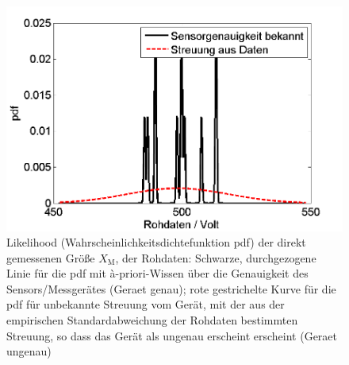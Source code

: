 \begin{figure}[!htp]
	\begin{center}
		\includegraphics[width=120mm]{10_vorlesung/media/Rohdaten.png}
		\caption{Likelihood (Wahrscheinlichkeitsdichtefunktion pdf)
		der direkt gemessenen Größe $X_\mathrm{M}$, der Rohdaten: Schwarze, durchgezogene Linie
		für die pdf mit {\`a}-priori-Wissen über die Genauigkeit des Sensors/Messgerätes
		(\glqq Geraet genau\grqq);
		rote gestrichelte Kurve für die pdf für unbekannte Streuung vom Gerät,
		mit der aus der empirischen Standardabweichung der Rohdaten
		bestimmten Streuung, so dass das Gerät als ungenau erscheint erscheint (\glqq Geraet ungenau\grqq)}
		\label{fig:Rohdaten}
	\end{center}
\end{figure}
\newpage
